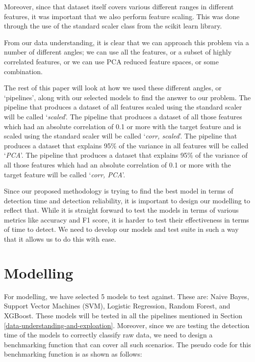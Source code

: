 \documentclass[journal]{IEEEtran}
\begin{document}
Moreover, since that dataset itself covers various different ranges in different features, it was important that we also perform feature scaling. This was done through the use of the standard scaler class from the scikit learn library.

From our data understanding, it is clear that we can approach this problem via a number of different angles; we can use all the features, or a subset of highly correlated features, or we can use PCA reduced feature spaces, or some combination. 

The rest of this paper will look at how we used these different angles, or `pipelines', along with our selected models to find the answer to our problem. The pipeline that produces a dataset of all features scaled using the standard scaler will be called `\textit{scaled}'. The pipeline that produces a dataset of all those features which had an absolute correlation of 0.1 or more with the target feature and is scaled using the standard scaler will be called `\textit{corr, scaled}'. The pipeline that produces a dataset that explains 95\% of the variance in all features will be called `\textit{PCA}'. The pipeline that produces a dataset that explains 95\% of the variance of all those features which had an absolute correlation of 0.1 or more with the target feature will be called `\textit{corr, PCA}'.

Since our proposed methodology is trying to find the best model in terms of detection time and detection reliability, it is important to design our modelling to reflect that. While it is straight forward to test the models in terms of various metrics like accuracy and F1 score, it is harder to test their effectiveness in terms of time to detect. We need to develop our models and test suite in such a way that it allows us to do this with ease.

\section{Modelling}

For modelling, we have selected 5 models to test against. These are: Naive Bayes, Support Vector Machines (SVM), Logistic Regression, Random Forest, and XGBoost. These models will be tested in all the pipelines mentioned in Section \ref{data-understanding-and-exploation}. Moreover, since we are testing the detection time of the models to correctly classify raw data, we need to design a benchmarking function that can cover all such scenarios. The pseudo code for this benchmarking function is as shown as follows:
\end{document}
